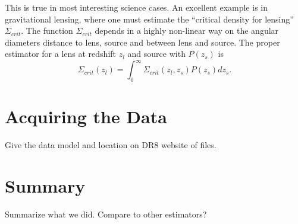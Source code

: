\documentclass[preprint]{aastex}
\begin{document}
This is true in most interesting science cases.  An excellent example is in
gravitational lensing, where one must estimate the ``critical density for
lensing'' $\Sigma_{crit}$.  The function $\Sigma_{crit}$ depends in a highly
non-linear way on the angular diameters distance to lens, source and between
lens and source.  The proper estimator for a lens at redshift $z_{l}$ and
source with $P(z_s)$ is
\begin{equation}
\Sigma_{crit}(z_l) = \int_{0}^{\infty} \Sigma_{crit}(z_l, z_s) P(z_s) dz_s.
\end{equation}

\section{Acquiring the Data}

Give the data model and location on DR8 website of files.

\section{Summary}

Summarize what we did.  Compare to other estimators?



\end{document}

